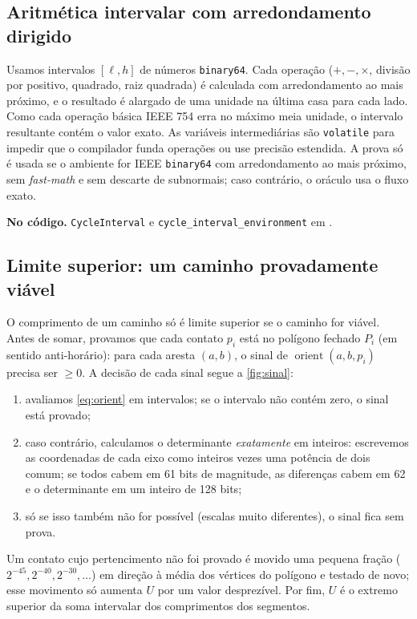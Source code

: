 \documentclass[11pt,a4paper]{article}
\theoremstyle{plain}\newtheorem{proposicao}{Proposição}
\theoremstyle{definition}\newtheorem{definicao}{Definição}
\theoremstyle{plain}\newtheorem{teorema}{Teorema}
\newcommand{\code}[1]{\texttt{\small #1}}
\begin{document}
\subsection{Aritmética intervalar com arredondamento dirigido}\label{sec:intervalos}
Usamos intervalos \([\ell,h]\) de números \texttt{binary64}. Cada operação (\(+,-,\times\), divisão por positivo, quadrado, raiz quadrada) é calculada com arredondamento ao mais próximo, e o resultado é alargado de uma unidade na última casa para cada lado. Como cada operação básica IEEE 754 erra no máximo meia unidade, o intervalo resultante contém o valor exato. As variáveis intermediárias são \code{volatile} para impedir que o compilador funda operações ou use precisão estendida. A prova só é usada se o ambiente for IEEE \texttt{binary64} com arredondamento ao mais próximo, sem \emph{fast-math} e sem descarte de subnormais; caso contrário, o oráculo usa o fluxo exato.

\begin{fonte}
\textbf{No código.} \code{CycleInterval} e \code{cycle\_interval\_environment} em .
\end{fonte}

\subsection{Limite superior: um caminho provadamente viável}\label{sec:superior}
O comprimento de um caminho só é limite superior se o caminho for viável. Antes de somar, provamos que cada contato \(p_i\) está no polígono fechado \(P_i\) (em sentido anti-horário): para cada aresta \((a,b)\), o sinal de \(\operatorname{orient}(a,b,p_i)\) precisa ser \(\ge0\). A decisão de cada sinal segue a \cref{fig:sinal}:
\begin{enumerate}[leftmargin=*,itemsep=1pt]
\item avaliamos \eqref{eq:orient} em intervalos; se o intervalo não contém zero, o sinal está provado;
\item caso contrário, calculamos o determinante \emph{exatamente} em inteiros: escrevemos as coordenadas de cada eixo como inteiros vezes uma potência de dois comum; se todos cabem em 61 bits de magnitude, as diferenças cabem em 62 e o determinante em um inteiro de 128 bits;
\item só se isso também não for possível (escalas muito diferentes), o sinal fica sem prova.
\end{enumerate}
Um contato cujo pertencimento não foi provado é movido uma pequena fração (\(2^{-45},2^{-40},2^{-30},\dots\)) em direção à média dos vértices do polígono e testado de novo; esse movimento só aumenta \(U\) por um valor desprezível. Por fim, \(U\) é o extremo superior da soma intervalar dos comprimentos dos segmentos.
\end{document}
